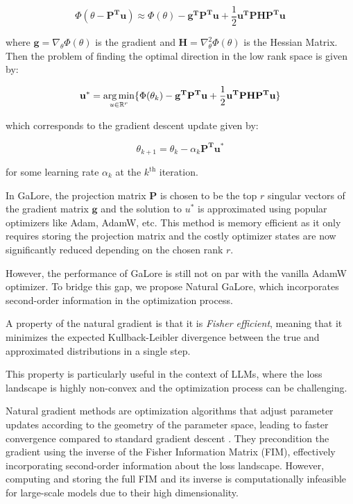 \[
\Phi(\theta - \mathbf{P^T u}) \approx \Phi(\theta) - \mathbf{g^T P^T u} + \frac{1}{2} \mathbf{u^T PHP^T  u}
\]

where \(\mathbf{g} = \nabla_{\theta} \Phi(\theta)\) is the gradient and \(\mathbf{H} = \nabla^2_{\theta} \Phi(\theta)\) is the Hessian Matrix. Then the problem of finding the optimal direction in the low rank space is given by:

\[
\mathbf{u^*} = \operatorname*{arg\,min}_{u\in \mathbb{R}^r} \{\Phi(\theta_{k}) - \mathbf{g^T P^T u} + \frac{1}{2} \mathbf{u^T PHP^T  u}\}
\]

which corresponds to the gradient descent update given by:

\[
\theta_{k+1} = \theta_{k} - \alpha_{k} \mathbf{P^T u^*}
\]

for some learning rate $\alpha_{k}$ at the $k^{\text{th}}$ iteration.

In GaLore, the projection matrix $\mathbf{P}$ is chosen to be the top $r$ singular vectors of the gradient matrix $\mathbf{g}$ and the solution to $u^*$ is approximated using popular optimizers like Adam, AdamW, etc. This method is memory efficient as it only requires storing the projection matrix and the costly optimizer states are now significantly reduced depending on the chosen rank $r$.



However, the performance of GaLore is still not on par with the vanilla AdamW optimizer. To bridge this gap, we propose Natural GaLore, which incorporates second-order information in the optimization process.

A property of the natural gradient is that it is \textit{Fisher efficient}, meaning that it minimizes the expected Kullback-Leibler divergence between the true and approximated distributions in a single step. 

This property is particularly useful in the context of LLMs, where the loss landscape is highly non-convex and the optimization process can be challenging.

Natural gradient methods are optimization algorithms that adjust parameter updates according to the geometry of the parameter space, leading to faster convergence compared to standard gradient descent \citep{amariNaturalGradientWorks1998}. They precondition the gradient using the inverse of the Fisher Information Matrix (FIM), effectively incorporating second-order information about the loss landscape. However, computing and storing the full FIM and its inverse is computationally infeasible for large-scale models due to their high dimensionality.


